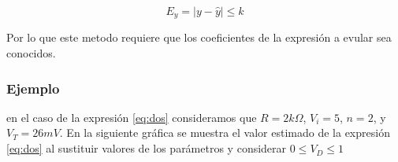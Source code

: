 \documentclass[letterpaper,10pt,english]{/usr/lib/python3.3/site-packages/sphinx/texinputs/sphinxhowto}
\begin{document}
\[
E_{y}=\vert y-\hat{y}\vert \leq k
\]

Por lo que este metodo requiere que los coeficientes de la expresión a
evular sea conocidos.

\subsubsection{Ejemplo}

en el caso de la expresión \eqref{eq:dos} consideramos que $R=2k\Omega$,
$V_{i}=5$, $n=2$, y $V_{T}=26mV$. En la siguiente gráfica se muestra el
valor estimado de la expresión \eqref{eq:dos} al sustituir valores de
los parámetros y considerar $0\leq V_{D} \leq 1$

\end{document}
